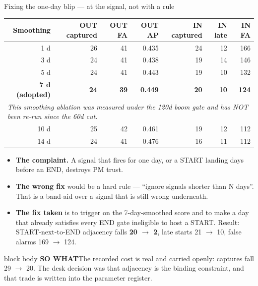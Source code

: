 \documentclass[aspectratio=169,11pt]{beamer}
\newcommand{\sowhatfont}{\footnotesize}
\newcommand{\sowhat}[1]{%
  \vspace{0.3em}
  \begin{beamercolorbox}[wd=\linewidth,sep=0.55em]{block body}
    {\sowhatfont\textbf{\color{gicnavy}SO WHAT}\quad #1}
  \end{beamercolorbox}}
\begin{document}
\begin{frame}{Fixing the one-day blip --- at the signal, not with a rule}
  \footnotesize
  \begin{table}
    \begin{tabular}{@{}rrrrrrr@{}}
      \toprule
      \textbf{Smoothing} & \textbf{OUT captured} & \textbf{OUT FA}
      & \textbf{OUT AP} & \textbf{IN captured} & \textbf{IN late}
      & \textbf{IN FA} \\
      \midrule
      1 d  & 26 & 41 & 0.435 & 24 & 12 & 166 \\
      3 d  & 24 & 41 & 0.438 & 19 & 14 & 146 \\
      5 d  & 24 & 41 & 0.443 & 19 & 10 & 132 \\
      \textbf{7 d (adopted)} & \textbf{24} & \textbf{39} & \textbf{0.449}
        & \textbf{20} & \textbf{10} & \textbf{124} \\
      \multicolumn{7}{l}{\emph{\scriptsize This smoothing ablation was measured under the 120d boom gate and has NOT been re-run since the 60d cut.}} \\
      10 d & 25 & 42 & 0.461 & 19 & 12 & 112 \\
      14 d & 24 & 41 & 0.476 & 16 & 11 & 112 \\
      \bottomrule
    \end{tabular}
  \end{table}
  \begin{itemize}\scriptsize
    \item \textbf{The complaint.} A signal that fires for one day, or a START
      landing days before an END, destroys PM trust.
    \item \textbf{The wrong fix} would be a hard rule --- ``ignore signals
      shorter than N days''. That is a band-aid over a signal that is still
      wrong underneath.
    \item \textbf{The fix taken} is to trigger on the 7-day-smoothed score and
      to make a day that already satisfies every END gate ineligible to host a
      START. Result: START-next-to-END adjacency falls \textbf{20 $\rightarrow$ 2},
      late starts 21 $\rightarrow$ 10, false alarms 169 $\rightarrow$ 124.
  \end{itemize}
  \sowhat{The recorded cost is real and carried openly: captures fall
    29 $\rightarrow$ 20. The desk decision was that adjacency is the binding
    constraint, and that trade is written into the parameter register.}
\end{frame}
\end{document}
